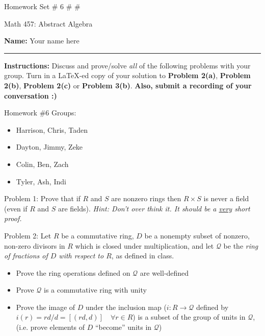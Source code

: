 \documentclass{article}
\theoremstyle{definition}
\begin{document}
\begin{center}
\Large{Homework Set \# 6}
\#
#

\normalsize{Math 457: Abstract Algebra}

\vspace{0.2cm}

\hfill {\bf Name:} Your name here

\vspace{0.25cm}
\hrule
\end{center}

\vspace{0.3cm}



\noindent \textbf{Instructions:}  Discuss and prove/solve \emph{all} of the following problems with your group.  Turn in a \LaTeX-ed copy of your solution to \textbf{Problem 2(a)}, \textbf{Problem 2(b)}, \textbf{Problem 2(c)} or \textbf{Problem 3(b)}.   \textbf{Also, submit a recording of your conversation :)}  


\bigskip

\noindent Homework \#6 Groups: 
\begin{multicols}{2}
\begin{itemize}
    \item[(1)] Harrison, Chris, Taden
    \item[(2)] Dayton, Jimmy, Zeke
    \item[(3)] Colin, Ben, Zach
    \item[(4)] Tyler, Ash, Indi
\end{itemize}
\end{multicols}
\vspace{1cm}

\noindent Problem 1:   %
Prove that if $R$ and $S$ are nonzero rings then $R\times S$ is never a field (even if $R$ and $S$ are fields).  \emph{Hint: Don't over think it.  It should be a \underline{very} short proof.}

\vspace{1cm}

\noindent Problem 2:  %
Let $R$ be a commutative ring, $D$ be a nonempty subset of nonzero, non-zero divisors in $R$ which is closed under multiplication, and let $\mathcal{Q}$ be the \emph{ring of fractions of $D$ with respect to $R$}, as defined in class. 
 \begin{itemize}
     \item[(a)] Prove the ring operations defined on $\mathcal{Q}$ are well-defined
     \item[(b)] Prove $\mathcal{Q}$ is a commutative ring with unity
     \item[(c)] Prove the image of $D$ under the inclusion map ($i:R\rightarrow \mathcal{Q}$ defined by $i(r)=rd/d=[(rd,d)]\quad \forall r\in R$) is a subset of the group of units in $\mathcal{Q}$, (i.e. prove elements of $D$ ``become'' units in $\mathcal{Q}$)
\end{itemize}
\end{document}
